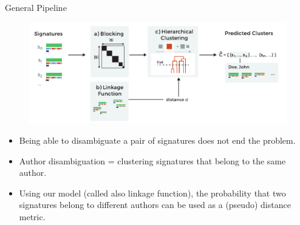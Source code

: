 \documentclass{beamer}
\begin{document}

\begin{frame} {General Pipeline}


\begin{figure}
   \centering
   \includegraphics[width=\textwidth]{./figures/fig-workflow.pdf}
\end{figure}

\begin{itemize}
\item Being able to disambiguate a pair of signatures does not end the problem. \\[0.5em]

\item Author disambiguation = {\color{red} clustering signatures that belong to the same author}.\\[0.5em]

\item Using our model (called also linkage function), the probability
      that two signatures belong to different authors can be used as a (pseudo) distance metric.
\end{itemize}

\end{frame}


\end{document}
